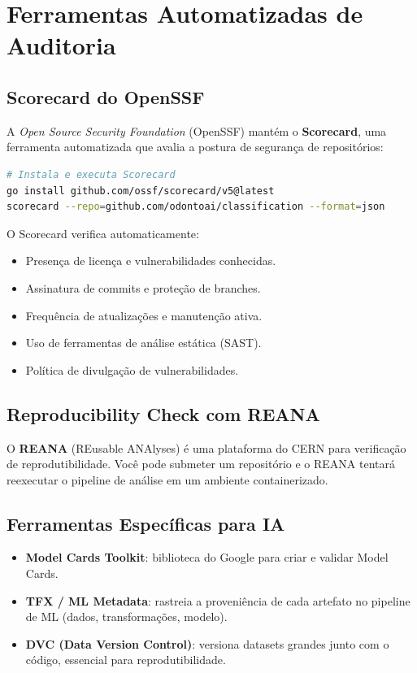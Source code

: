 \section{Ferramentas Automatizadas de Auditoria}

\subsection{Scorecard do OpenSSF}

A \textit{Open Source Security Foundation} (OpenSSF) mantém o
\textbf{Scorecard}, uma ferramenta automatizada que avalia a postura de
segurança de repositórios:

\begin{lstlisting}[language=bash]
# Instala e executa Scorecard
go install github.com/ossf/scorecard/v5@latest
scorecard --repo=github.com/odontoai/classification --format=json
\end{lstlisting}

O Scorecard verifica automaticamente:
\begin{itemize}
  \item Presença de licença e vulnerabilidades conhecidas.
  \item Assinatura de commits e proteção de branches.
  \item Frequência de atualizações e manutenção ativa.
  \item Uso de ferramentas de análise estática (SAST).
  \item Política de divulgação de vulnerabilidades.
\end{itemize}

\subsection{Reproducibility Check com REANA}

O \textbf{REANA} (REusable ANAlyses) é uma plataforma do CERN para
verificação de reprodutibilidade. Você pode submeter um repositório
e o REANA tentará reexecutar o pipeline de análise em um ambiente
containerizado.

\subsection{Ferramentas Específicas para IA}

\begin{itemize}
  \item \textbf{Model Cards Toolkit}: biblioteca do Google para criar e
    validar Model Cards.
  \item \textbf{TFX / ML Metadata}: rastreia a proveniência de cada
    artefato no pipeline de ML (dados, transformações, modelo).
  \item \textbf{DVC (Data Version Control)}: versiona datasets grandes
    junto com o código, essencial para reprodutibilidade.
\end{itemize}

